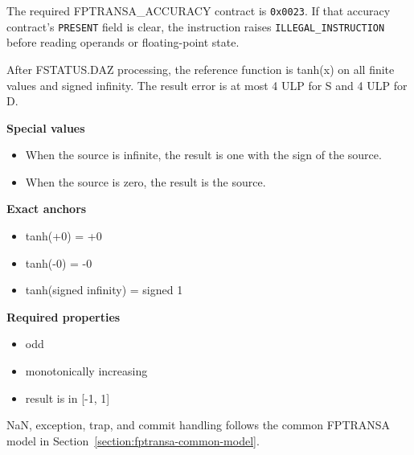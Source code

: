 The required FPTRANSA\_ACCURACY contract is \texttt{0x0023}. If that accuracy contract's \texttt{PRESENT} field is clear, the instruction raises \texttt{ILLEGAL\_INSTRUCTION} before reading operands or floating-point state.

After FSTATUS.DAZ processing, the reference function is tanh(x) on all finite values and signed infinity. The result error is at most 4 ULP for S and 4 ULP for D.

\textbf{Special values}\par
\begin{itemize}
\item When the source is infinite, the result is one with the sign of the source.
\item When the source is zero, the result is the source.
\end{itemize}

\textbf{Exact anchors}\par
\begin{itemize}
\item tanh(+0) = +0
\item tanh(-0) = -0
\item tanh(signed infinity) = signed 1
\end{itemize}

\textbf{Required properties}\par
\begin{itemize}
\item odd
\item monotonically increasing
\item result is in [-1, 1]
\end{itemize}

NaN, exception, trap, and commit handling follows the common FPTRANSA model in Section~\ref{section:fptransa-common-model}.
